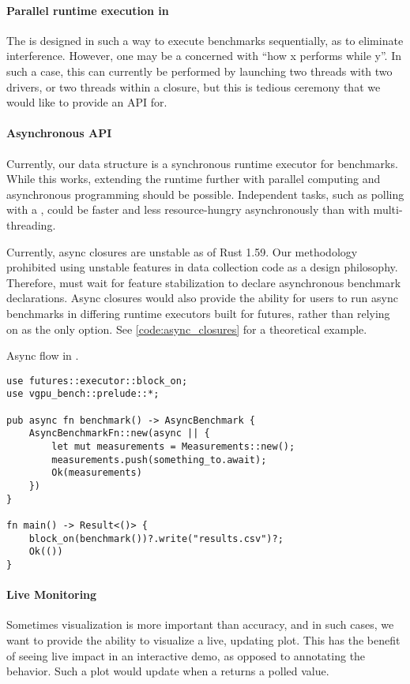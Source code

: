 \paragraph{Parallel runtime execution in }
The  is designed in such a way to execute benchmarks sequentially, as to eliminate interference. However, one may be a concerned with ``how x performs while y''. In such a case, this can currently be performed by launching two threads with two drivers, or two threads within a closure, but this is tedious ceremony that we would like to provide an API for.\medskip

\paragraph{Asynchronous API}
Currently, our  data structure is a synchronous runtime executor for benchmarks. While this works, extending the runtime further with parallel computing and asynchronous programming should be possible. Independent tasks, such as polling with a , could be faster and less resource-hungry asynchronously than with multi-threading.\medskip

Currently, async closures are unstable as of Rust 1.59. Our methodology prohibited using unstable features in data collection code as a design philosophy. Therefore, \toollinkedname must wait for feature stabilization to declare asynchronous benchmark declarations. Async closures would also provide the ability for users to run async benchmarks in differing runtime executors built for futures, rather than relying on  as the only option. See \cref{code:async_closures} for a theoretical example.

\begin{snippet}
\caption{Async flow in \toollinkedname.}\label{code:async_closures}
\begin{verbatim}
use futures::executor::block_on;
use vgpu_bench::prelude::*;

pub async fn benchmark() -> AsyncBenchmark {
    AsyncBenchmarkFn::new(async || {
        let mut measurements = Measurements::new();
        measurements.push(something_to.await);
        Ok(measurements)
    })
}

fn main() -> Result<()> {
    block_on(benchmark())?.write("results.csv")?;
    Ok(())
}
\end{verbatim}
\end{snippet}

\paragraph{Live Monitoring}
Sometimes visualization is more important than accuracy, and in such cases, we want to provide the ability to visualize a live, updating plot. This has the benefit of seeing live impact in an interactive demo, as opposed to annotating the behavior. Such a plot would update when a  returns a polled value.